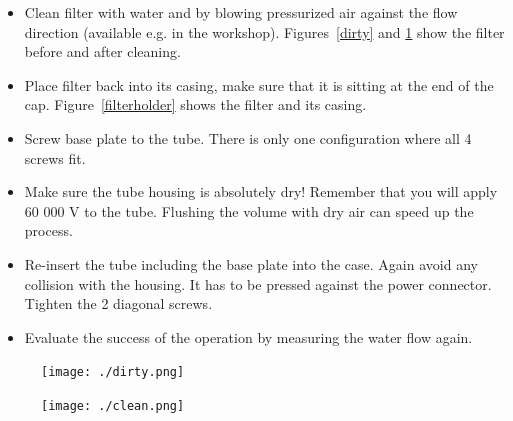 \documentclass[a4paper,12pt,twoside]{article}
\begin{document}
\begin{appendices}
\begin{itemize}
\item Clean filter with water and by blowing pressurized air against the flow direction (available e.g. in the workshop). Figures~\ref{dirty} and \ref{clean} show the filter before and after cleaning.

\item Place filter back into its casing, make sure that it is sitting at the end of the cap. Figure~\ref{filterholder} shows the filter and its casing.

\item Screw base plate to the tube. There is only one configuration where all 4 screws fit.

\item Make sure the tube housing is absolutely dry! Remember that you will apply 60 000 V to the tube. Flushing the volume with dry air can speed up the process.

\item Re-insert the tube including the base plate into the case. Again avoid any collision with the housing. It has to be pressed against the power connector. Tighten the 2 diagonal screws.

\item Evaluate the success of the operation by measuring the water flow again.

\end{itemize}

\begin{figure} [h!]
\centering
\begin{minipage}{.48\textwidth}
  \centering
  \texttt{[image: ./dirty.png]}
  \label{dirty}
\end{minipage}%
\hspace{2mm}
\begin{minipage}{.48\textwidth}
  \centering
  \texttt{[image: ./clean.png]}
  \label{clean}
\end{minipage}
\end{figure}


\end{appendices}
\end{document}
